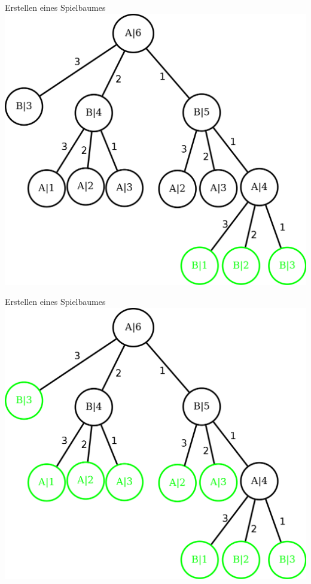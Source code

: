 \documentclass[18pt]{beamer}
\begin{document}
\begin{frame}{Erstellen eines Spielbaumes}
\includegraphics[scale=0.55]{baum3.png}
\end{frame}

\begin{frame}{Erstellen eines Spielbaumes}
\includegraphics[scale=0.55]{baum4.png}
\end{frame}
\end{document}
